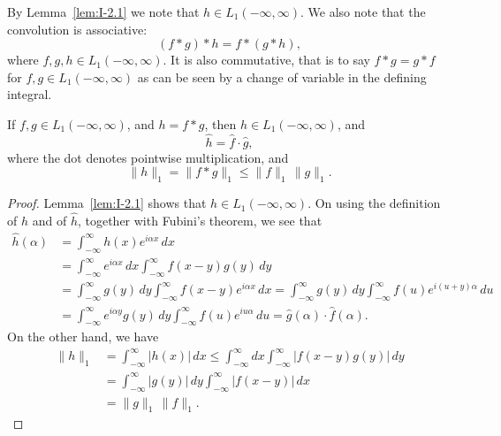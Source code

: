 By Lemma~\ref{lem:I-2.1} we note that $h\in L_1(-\infty,\infty)$. We also note that the convolution is associative:
\begin{equation*}
(f*g)*h=f*(g*h),
\end{equation*}
where $f,g,h\in L_1(-\infty,\infty)$. It is also commutative, that is to say $f*g=g*f$ for $f,g\in L_1(-\infty,\infty)$ as can be seen by a change of variable in the defining integral.

\begin{theorem}\label{thm:I-2}
If $f,g\in L_1(-\infty,\infty)$, and $h=f*g$, then $h\in L_1(-\infty,\infty)$, and
\begin{equation}\label{eq:I-2.2}
\hat h=\hat f\cdot\hat g,
\end{equation}
where the dot denotes pointwise multiplication, and
\begin{equation}\label{eq:I-2.3}
\|h\|_1=\|f*g\|_1\le\|f\|_1\,\|g\|_1.
\end{equation}
\end{theorem}

\begin{proof}
Lemma~\ref{lem:I-2.1} shows that $h\in L_1(-\infty,\infty)$. On using the definition of $h$ and of $\hat h$, together with Fubini's theorem, we see that
\begin{align*}
\hat h(\alpha)&=\int_{-\infty}^{\infty}h(x)e^{i\alpha x}\,dx\\
&=\int_{-\infty}^{\infty}e^{i\alpha x}\,dx\int_{-\infty}^{\infty}f(x-y)g(y)\,dy\\
&=\int_{-\infty}^{\infty}g(y)\,dy\int_{-\infty}^{\infty}f(x-y)e^{i\alpha x}\,dx
=\int_{-\infty}^{\infty}g(y)\,dy\int_{-\infty}^{\infty}f(u)e^{i(u+y)\alpha}\,du\\
&=\int_{-\infty}^{\infty}e^{i\alpha y}g(y)\,dy\int_{-\infty}^{\infty}f(u)e^{iu\alpha}\,du
=\widehat g(\alpha)\cdot\widehat f(\alpha).
\end{align*}
On the other hand, we have
\begin{equation*}
\begin{aligned}
\|h\|_1 &= \int_{-\infty}^{\infty}|h(x)|\,dx
\le\int_{-\infty}^{\infty}dx\int_{-\infty}^{\infty}|f(x-y)g(y)|\,dy\\
&= \int_{-\infty}^{\infty}|g(y)|\,dy\int_{-\infty}^{\infty}|f(x-y)|\,dx\\
&= \|g\|_1\,\|f\|_1.
\end{aligned}
\end{equation*}
\end{proof}

